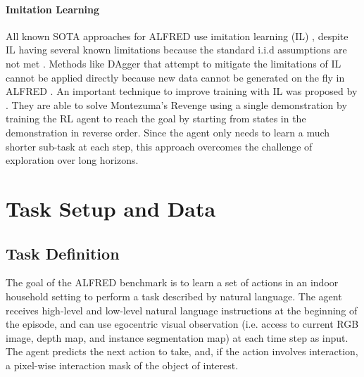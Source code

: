 \documentclass[11pt,a4paper]{article}
\begin{document}
\paragraph{Imitation Learning}
\label{ssec:rlil}
All known SOTA approaches \cite{singh2020moca, corona2020modularity, Storks2021AreWT} for ALFRED use imitation learning (IL) \cite{hussein2017imitation}, despite IL having several known limitations because the standard i.i.d assumptions are not met \cite{ross2010efficient}. Methods like DAgger \cite{ross2011reduction} that attempt to mitigate the limitations of IL cannot be applied directly because new data cannot be generated on the fly in ALFRED \cite{shridhar2020alfred}. An important technique to improve training with IL was proposed by \cite{salimans2018learning}. They are able to solve Montezuma's Revenge using a single demonstration by training the RL agent to reach the goal by starting from states in the demonstration in reverse order. Since the agent only needs to learn a much shorter sub-task at each step, this approach overcomes the challenge of exploration over long horizons. 


\section{Task Setup and Data}
\subsection{Task Definition}
The goal of the ALFRED benchmark is to learn a set of actions in an indoor household setting to perform a task described by natural language. The agent receives high-level and low-level natural language instructions at the beginning of the episode, and can use egocentric visual observation (i.e. access to current RGB image, depth map, and instance segmentation map) at each time step as input. The agent predicts the next action to take, and, if the action involves interaction, a pixel-wise interaction mask of the object of interest. 

\end{document}
